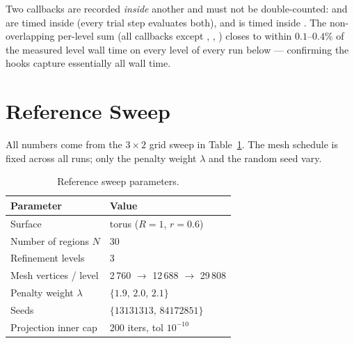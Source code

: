 \documentclass[11pt,a4paper]{article}
\begin{document}
\begin{tcolorbox}[colback=blue!4!white, colframe=blue!40!black,
                  title={Nesting of callbacks (matters for accounting)},
                  fontupper=\small]
Two callbacks are recorded \emph{inside} another and must not be
double-counted:  and  are timed inside
 (every trial step evaluates both), and
 is timed inside .  The
non-overlapping per-level sum (all callbacks except ,
, ) closes to within
$0.1$--$0.4\%$ of the measured level wall time on every level of every
run below --- confirming the hooks capture essentially all wall time.
\end{tcolorbox}

\section{Reference Sweep}
\label{sec:ref-run}

All numbers come from the $3\times2$ grid sweep in
Table~\ref{tab:reference-run}.  The mesh schedule is fixed across all
runs; only the penalty weight $\lambda$ and the random seed vary.

\begin{table}[H]
\centering
\caption{Reference sweep parameters.}
\label{tab:reference-run}
\renewcommand{\arraystretch}{1.2}
\begin{tabular}{ll}
\toprule
\textbf{Parameter} & \textbf{Value} \\
\midrule
Surface                & torus ($R=1$, $r=0.6$) \\
Number of regions $N$  & 30 \\
Refinement levels      & 3 \\
Mesh vertices / level  & 2\,760 $\to$ 12\,688 $\to$ 29\,808 \\
Penalty weight $\lambda$ & $\{1.9,\,2.0,\,2.1\}$ \\
Seeds                  & $\{13131313,\,84172851\}$ \\
Projection inner cap   & 200 iters, tol $10^{-10}$ \\
\bottomrule
\end{tabular}
\end{table}

\end{document}
